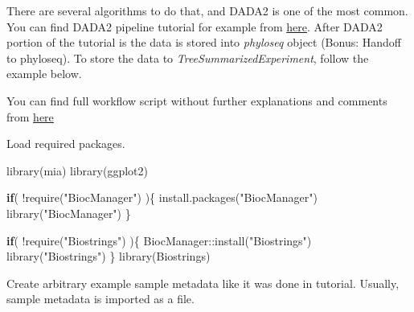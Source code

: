 \documentclass[
]{book}
\newenvironment{Shaded}{\begin{snugshade}}{\end{snugshade}}
\newcommand{\ControlFlowTok}[1]{\textcolor[rgb]{0.13,0.29,0.53}{\textbf{#1}}}
\newcommand{\FunctionTok}[1]{\textcolor[rgb]{0.00,0.00,0.00}{#1}}
\newcommand{\NormalTok}[1]{#1}
\newcommand{\SpecialCharTok}[1]{\textcolor[rgb]{0.00,0.00,0.00}{#1}}
\newcommand{\StringTok}[1]{\textcolor[rgb]{0.31,0.60,0.02}{#1}}
\begin{document}
There are several algorithms to do that, and DADA2 is one of the most common.
You can find DADA2 pipeline tutorial for example from
\href{https://benjjneb.github.io/dada2/tutorial.html}{here}.
After DADA2 portion of the tutorial is the data is stored into \emph{phyloseq} object
(Bonus: Handoff to phyloseq). To store the data to \emph{TreeSummarizedExperiment},
follow the example below.

You can find full workflow script without further explanations and comments from
\href{https://github.com/microbiome/OMA/blob/master/dada2_workflow.Rmd}{here}

Load required packages.

\begin{Shaded}
\begin{Highlighting}[]
\FunctionTok{library}\NormalTok{(mia)}
\FunctionTok{library}\NormalTok{(ggplot2)}

\ControlFlowTok{if}\NormalTok{( }\SpecialCharTok{!}\FunctionTok{require}\NormalTok{(}\StringTok{"BiocManager"}\NormalTok{) )\{}
    \FunctionTok{install.packages}\NormalTok{(}\StringTok{"BiocManager"}\NormalTok{)}
    \FunctionTok{library}\NormalTok{(}\StringTok{"BiocManager"}\NormalTok{)}
\NormalTok{\}}

\ControlFlowTok{if}\NormalTok{( }\SpecialCharTok{!}\FunctionTok{require}\NormalTok{(}\StringTok{"Biostrings"}\NormalTok{) )\{}
\NormalTok{    BiocManager}\SpecialCharTok{::}\FunctionTok{install}\NormalTok{(}\StringTok{"Biostrings"}\NormalTok{)}
    \FunctionTok{library}\NormalTok{(}\StringTok{"Biostrings"}\NormalTok{)}
\NormalTok{\}}
\FunctionTok{library}\NormalTok{(Biostrings)}
\end{Highlighting}
\end{Shaded}

Create arbitrary example sample metadata like it was done in tutorial. Usually,
sample metadata is imported as a file.
\end{document}
